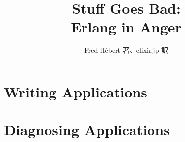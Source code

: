 \documentclass[autodetect-engine, dvipdfmx-if-dvi, base=11pt, oneside, ja=standard, jafont=sourcehan-jp]{bxjsreport}
\title{Stuff Goes Bad:\protect\\ Erlang in Anger}
\author{Fred Hébert 著、elixir.jp 訳}
\begin{document}
\frontmatter

\maketitle





\clearpage

\tableofcontents

\listoffigures

\hypersetup{linkcolor=violet}



\mainmatter

\part{Writing Applications}
\label{part:writing-applications}



%

\part{Diagnosing Applications}
\label{part:diagnosing-applictions}

%
%
%
%
%
%










\end{document}
